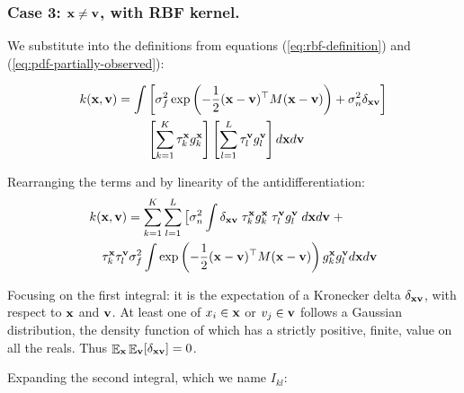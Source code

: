 \documentclass[letterpaper]{article}
\DeclareMathOperator*{\E}{\Ex}
\newcommand{\Ex}{\mathbb{E}}
\newcommand{\tp}{\top}
\newcommand{\vx}{{\bf x}}
\newcommand{\vv}{{\bf v}}
\begin{document}
\subsubsection{Case 3: $\vx\neq\vv$, with \ac{RBF} kernel.}
We substitute into  the definitions from equations
(\ref{eq:rbf-definition}) and (\ref{eq:pdf-partially-observed}):

\begin{equation*}
\begin{aligned}
 k(\vx, \vv) = \int & \left[\sigma_f^2 \exp\left( -\frac{1}{2}(\vx - \vv)^\tp M (\vx - \vv) \right) + \sigma_n^2 \delta_{\vx\vv} \right] \\
 & \left[\sum_{k=1}^K \tau_k^\vx g_k^\vx \right]
 \left[\sum_{l=1}^L \tau_l^\vv g_l^\vv \right]
 d\vx d\vv
\end{aligned}
\end{equation*}

Rearranging the terms and by linearity of the antidifferentiation:
\begin{equation}
\begin{aligned}
  &k(\vx,\vv) = \sum_{k=1}^K \sum_{l=1}^L \big[\sigma_n^2 \int \delta_{\vx\vv} \; \tau^\vx_k g_k^\vx \; \tau^\vv_l g_l^\vv \; d\vx d\vv \; + \\
  &\hspace{1em}\tau^\vx_k \tau^\vv_l \sigma_f^2 \int \exp\left(-\frac{1}{2}(\vx-\vv)^\tp M (\vx-\vv)\right)
g_k^\vx g_l^\vv d\vx d\vv
\end{aligned}
\label{eq:kxv-2integrals}
\end{equation}

Focusing on the first integral: it is the expectation of a Kronecker delta
$\delta_{\vx\vv}$, with respect to $\vx$ and $\vv$. At least one of $x_i \in \vx$ or
$v_j \in \vv$ follows a Gaussian distribution, the density function of which has
a strictly positive, finite, value on all
the reals. Thus $\E_\vx\E_\vv[\delta_{\vx\vv}] = 0$.

Expanding the second integral, which we name $I_{kl}$:
\end{document}
